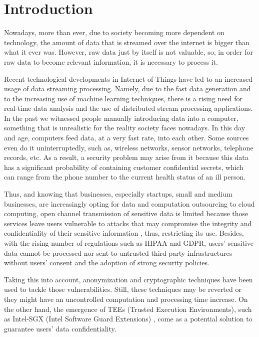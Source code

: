 \section{Introduction}\label{c:intro}

Nowadays, more than ever, due to society becoming more dependent on technology, the amount of data that is streamed over the internet is bigger than what it ever was. However, raw data just by itself is not valuable, so, in order for raw data to become relevant information, it is necessary to process it.

Recent technological developments in Internet of Things have led to an increased usage of data streaming processing. Namely, due to the fast data generation and to the increasing use of machine learning techniques, there is a rising need for real-time data analysis and the use of distributed stream processing applications.
In the past we witnessed people manually introducing data into a computer, something that is unrealistic for the reality society faces nowadays. In this day and age, computers feed data, at a very fast rate, into each other. Some sources even do it uninterruptedly, such as, wireless networks, sensor networks, telephone records, etc. \cite{dataprocessingbook} %
As a result, a security problem may arise from it because this data has a significant probability of containing customer confidential secrets, which can range from the phone number to the current health status of an ill person. \cite{anonymizingstreamingdata, 7024651} %

Thus, and knowing that businesses, especially startups, small and medium businesses, are increasingly opting for data and computation outsourcing to cloud computing, open channel transmission of sensitive data is limited because those services leave users vulnerable to attacks that may compromise the integrity and confidentiality of their sensitive information \cite{soteria, 6227695, IQBAL201698, 5655240}, thus, restricting its use.
Besides, with the rising number of regulations such as HIPAA and GDPR, users' sensitive data cannot be processed nor sent to untrusted third-party infrastructures without users’ consent and the adoption of strong security policies. \cite{usersdataarticle, dataprotection}

Taking this into account, anonymization and cryptographic techniques have been used to tackle those vulnerabilities. Still, these techniques may be reverted or they might have an uncontrolled computation and processing time increase. On the other hand, the emergence of TEEs (Trusted Execution Environments), such as Intel-SGX (Intel Software Guard Extensions) \cite{intelsgxexplained}, come as a potential solution to guarantee users’ data confidentiality. 

